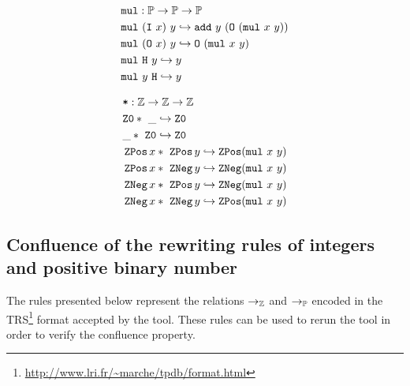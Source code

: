 \begin{minipage}[t]{0.45\textwidth}
\begin{align*}
&\texttt{mul} : \mathbb{P} \rightarrow \mathbb{P} \rightarrow \mathbb{P} \\
& \texttt{mul}~(\texttt{I}~x)~y \hookrightarrow \texttt{add}~y~(\texttt{O}~(\texttt{mul}~x~y)) \\
& \texttt{mul}~(\texttt{O}~x)~y \hookrightarrow \texttt{O}~(\texttt{mul}~x~y) \\
& \texttt{mul}~\texttt{H}~y \hookrightarrow y \\
& \texttt{mul}~y~\texttt{H} \hookrightarrow y \\
\end{align*}
\end{minipage}
\begin{minipage}[t]{0.48\textwidth}
\begin{align*}
&\texttt{*} : \mathbb{Z} \rightarrow \mathbb{Z} \rightarrow \mathbb{Z} \\
& \texttt{Z0} *~\_ \hookrightarrow \texttt{Z0} \\
& \_ *~\texttt{Z0} \hookrightarrow \texttt{Z0} \\
& \mathop{\texttt{ZPos}} x *~\mathop{\texttt{ZPos}} y \hookrightarrow \mathop{\texttt{ZPos}} (\texttt{mul}~x~y) \\
& \mathop{\texttt{ZPos}} x *~\mathop{\texttt{ZNeg}}    y \hookrightarrow \mathop{\texttt{ZNeg}}    (\texttt{mul}~x~y) \\
& \mathop{\texttt{ZNeg}}    x *~\mathop{\texttt{ZPos}} y \hookrightarrow \mathop{\texttt{ZNeg}}    (\texttt{mul}~x~y) \\
& \mathop{\texttt{ZNeg}}    x *~\mathop{\texttt{ZNeg}}    y \hookrightarrow \mathop{\texttt{ZPos}} (\texttt{mul}~x~y) \\
\end{align*}
\end{minipage}

\subsection{Confluence of the rewriting rules of integers and positive binary number}
\label{app:confluence-int-pos}

The rules presented below represent the relations $\rightarrow_\mathbb{Z}$ and $\rightarrow_\mathbb{P}$ encoded in the TRS\footnote{\url{http://www.lri.fr/~marche/tpdb/format.html}} format accepted by the \cite{CSI} tool.
These rules can be used to rerun the tool in order to verify the confluence property.

